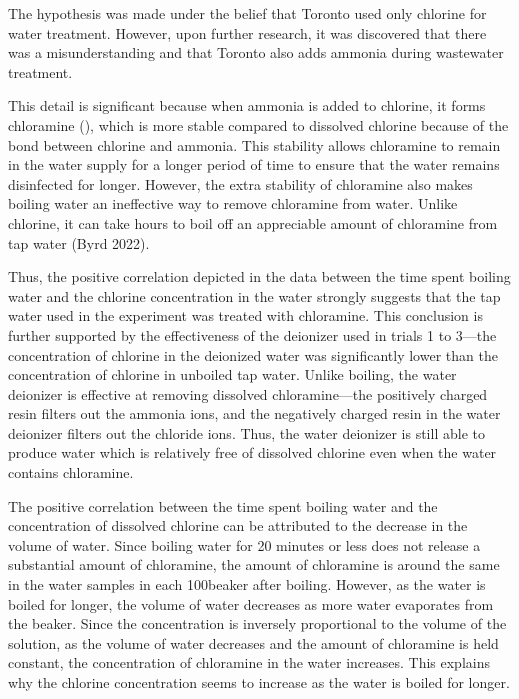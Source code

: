 \documentclass[11pt]{article}
\begin{document}
The hypothesis was made under the belief that Toronto used only chlorine for water treatment. However, upon further research, it was discovered that there was a misunderstanding and that Toronto also adds ammonia during wastewater treatment.

This detail is significant because when ammonia is added to chlorine, it forms chloramine (), which is more stable compared to dissolved chlorine because of the bond between chlorine and ammonia. This stability allows chloramine to remain in the water supply for a longer period of time to ensure that the water remains disinfected for longer. However, the extra stability of chloramine also makes boiling water an ineffective way to remove chloramine from water. Unlike chlorine, it can take hours to boil off an appreciable amount of chloramine from tap water (Byrd 2022).

Thus, the positive correlation depicted in the data between the time spent boiling water and the chlorine concentration in the water strongly suggests that the tap water used in the experiment was treated with chloramine. This conclusion is further supported by the effectiveness of the deionizer used in trials 1 to 3—the concentration of chlorine in the deionized water was significantly lower than the concentration of chlorine in unboiled tap water. Unlike boiling, the water deionizer is effective at removing dissolved chloramine—the positively charged resin filters out the ammonia ions, and the negatively charged resin in the water deionizer filters out the chloride ions. Thus, the water deionizer is still able to produce water which is relatively free of dissolved chlorine even when the water contains chloramine.

The positive correlation between the time spent boiling water and the concentration of dissolved chlorine can be attributed to the decrease in the volume of water. Since boiling water for 20 minutes or less does not release a substantial amount of chloramine, the amount of chloramine is around the same in the water samples in each 100\ml beaker after boiling. However, as the water is boiled for longer, the volume of water decreases as more water evaporates from the beaker. Since the concentration is inversely proportional to the volume of the solution, as the volume of water decreases and the amount of chloramine is held constant, the concentration of chloramine in the water increases. This explains why the chlorine concentration seems to increase as the water is boiled for longer.
\end{document}
